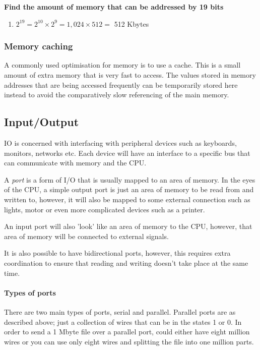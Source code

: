 \documentclass{article}
\begin{document}
{\bf Find the amount of memory that can be addressed by 19 bits}

\begin{enumerate}
	\item $2^{19} = 2^{10} \times 2^{9} = 1,024 \times 512 = $ 512 Kbytes
\end{enumerate}

\subsubsection{Memory caching}

A commonly used optimisation for memory is to use a cache. This is a small
amount of extra memory that is very fast to access. The values stored in memory
addresses that are being accessed frequently can be temporarily stored here
instead to avoid the comparatively slow referencing of the main memory.

\subsection{Input/Output}

IO is concerned with interfacing with peripheral devices such as keyboards,
monitors, networks etc. Each device will have an interface to a specific bus
that can communicate with memory and the CPU.

A {\it port} is a form of I/O  that is usually mapped to an area of memory. In
the eyes of the CPU, a simple output port is just an area of memory to be read
from and written to, however, it will also be mapped to some external connection
such as lights, motor or even more complicated devices such as a printer.

An input port will also 'look' like an area of memory to the CPU, however, that
area of memory will be connected to external signals.


It is also possible to have bidirectional ports, however, this requires extra
coordination to ensure that reading and writing doesn't take place at the same
time.

\paragraph{Types of ports}\mbox{}

There are two main types of ports, serial and parallel. Parallel ports are as
described above; just a collection of wires that can be in the states 1 or 0. In
order to send a 1 Mbyte file over a parallel port, could either have eight
million wires or you can use only eight wires and splitting the file into one
million parts.
\end{document}
